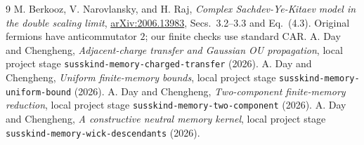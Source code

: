 \documentclass[11pt]{article}
\begin{document}
\begin{thebibliography}{9}
 M. Berkooz, V. Narovlansky, and H. Raj,
\emph{Complex Sachdev-Ye-Kitaev model in the double scaling limit},
\href{https://arxiv.org/abs/2006.13983}{arXiv:2006.13983},
Secs.~3.2--3.3 and Eq.~(4.3). Original fermions have anticommutator
$2$; our finite checks use standard CAR.
 A. Day and Chengheng,
\emph{Adjacent-charge transfer and Gaussian OU propagation},
local project stage \texttt{susskind-memory-charged-transfer} (2026).
 A. Day and Chengheng,
\emph{Uniform finite-memory bounds}, local project stage
\texttt{susskind-memory-uniform-bound} (2026).
 A. Day and Chengheng,
\emph{Two-component finite-memory reduction}, local project stage
\texttt{susskind-memory-two-component} (2026).
 A. Day and Chengheng,
\emph{A constructive neutral memory kernel}, local project stage
\texttt{susskind-memory-wick-descendants} (2026).
\end{thebibliography}
\end{document}
